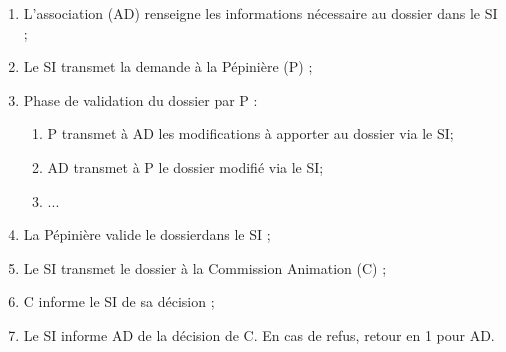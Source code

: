 \begin{enumerate}
\item L'association (AD) renseigne les informations nécessaire au dossier dans le SI ;
\item Le SI transmet la demande à la Pépinière (P) ;
\item Phase de validation du dossier par P : 
	\begin{enumerate}
	\item P transmet à AD les modifications à apporter au dossier via le SI;
	\item AD transmet à P le dossier modifié via le SI;
	\item ...
	\end{enumerate}
\item La Pépinière valide le dossierdans  le SI ; 
\item Le SI transmet le dossier à la Commission Animation (C) ;
\item C informe le SI de sa décision ;
\item Le SI informe AD de la décision de C. En cas de refus, retour en 1 pour AD.
\end{enumerate}
